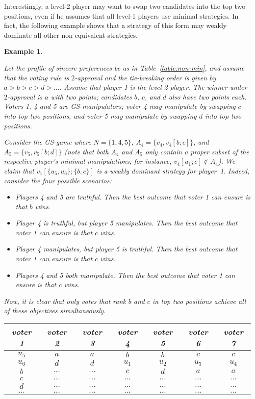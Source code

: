 \documentclass[11pt]{article}
\newtheorem{example}{Example}
\begin{document}
Interestingly, a level-2 player may want to swap two candidates into the top two positions, 
even if he assumes that all level-1 players use minimal strategies. In fact, the following example shows 
that a strategy of this form may weakly dominate all other non-equivalent strategies.

\begin{example}\label{ex:non-min}
{\em
Let the profile of sincere preferences be as in Table~\ref{table:non-min}, and assume that 
the voting rule is $2$-approval and the tie-breaking order is given by 
$a>b>c>d>\dots$. Assume that player 1 is the level-2 player.
The winner under $2$-approval is $a$ with two points; candidates $b$, $c$, and $d$
also have two points each. Voters 1, 4 and 5 are GS-manipulators; voter 4 may manipulate
by swapping $c$ into top two positions, and voter 5 may manipulate by swapping
$d$ into top two positions.

Consider the GS-game where $N=\{1, 4, 5\}$, $A_4=\{v_4, v_4[b;c]\}$, 
and $A_5=\{v_5, v_5[b;d]\}$ (note that both $A_4$ and $A_5$ only contain a proper subset
of the respective player's minimal manipulations; for instance, $v_4[u_1;c]\not\in A_4$). 
We claim that $v_1[\{u_5, u_6\};\{b, c\}]$
is a weakly dominant strategy for player~1. Indeed, consider the four possible scenarios:
\begin{itemize}
\item
Players 4 and 5 are truthful. Then the best outcome that voter 1 can ensure is that $b$ wins.
\item
Player 4 is truthful, but player 5 manipulates. Then the best outcome that voter 1 can ensure is that $c$ wins.
\item
Player 4 manipulates, but player 5 is truthful. Then the best outcome that voter 1 can ensure is that $c$ wins.
\item
Players 4 and 5 both manipulate. Then the best outcome that voter 1 can ensure is that $c$ wins.  
\end{itemize}
Now, it is clear that only votes that rank $b$ and $c$ in top two positions achieve 
all of these objectives simultaneously.

\begin{table}[h]
\begin{center}
\begin{tabular}{c|c|c|c|c|c|c}
voter 1&voter 2&voter 3&voter 4&voter 5&voter 6&voter 7\\
\midrule
$u_5$    &$a$      &$a$      &$b$      &$b$      &$c$      &$c$      \\
$u_6$    &$d$      &$d$      &$u_1$    &$u_2$    &$u_3$    &$u_4$    \\
$b$      &$\dots$  &$\dots$  &$c$      &$d$      &$a$      &$a$      \\
$c$      &$\dots$  &$\dots$  &$\dots$  &$\dots$  &$\dots$  &$\dots$  \\
$d$      &$\dots$  &$\dots$  &$\dots$  &$\dots$  &$\dots$  &$\dots$  \\
$\dots$  &$\dots$  &$\dots$  &$\dots$  &$\dots$  &$\dots$  &$\dots$  \\


\end{tabular}
\end{center}
\end{table}}
\end{example}
\end{document}
